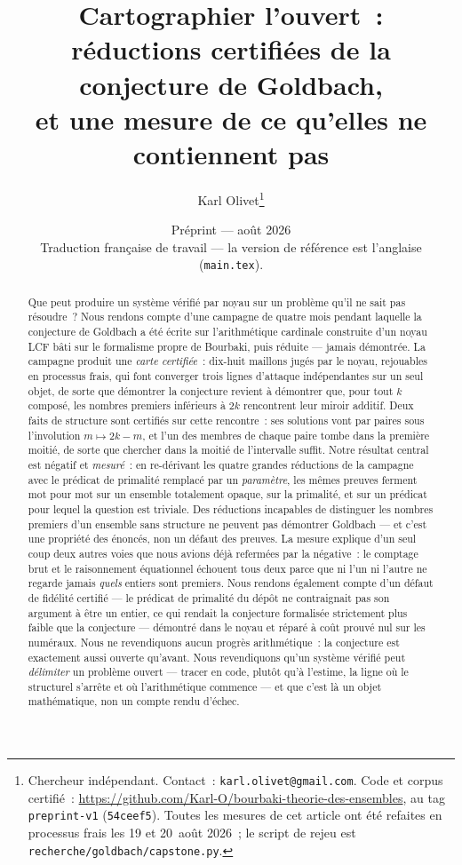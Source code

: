 \documentclass[11pt]{article}
\title{Cartographier l'ouvert~:\\
réductions certifiées de la conjecture de Goldbach,\\
et une mesure de ce qu'elles ne contiennent pas}
\author{Karl Olivet\thanks{Chercheur indépendant. Contact~:
\texttt{karl.olivet@gmail.com}. Code et corpus certifié~: \url{https://github.com/Karl-O/bourbaki-theorie-des-ensembles}, au tag
\texttt{preprint-v1} (\texttt{54ceef5}).
Toutes les mesures de cet article ont été refaites en processus frais les 19 et
20~août 2026~; le script de rejeu est \texttt{recherche/goldbach/capstone.py}.}}
\date{Préprint --- août 2026\\
{\small Traduction française de travail --- la version de référence est l'anglaise (\texttt{main.tex}).}}
\theoremstyle{remark}\newtheorem{remarque}{Remarque}
\begin{document}
\maketitle

\begin{abstract}
Que peut produire un système vérifié par noyau sur un problème qu'il ne sait pas
résoudre~? Nous rendons compte d'une campagne de quatre mois pendant laquelle la
conjecture de Goldbach a été écrite sur l'arithmétique cardinale construite d'un noyau
LCF bâti sur le formalisme propre de Bourbaki, puis réduite --- jamais démontrée. La
campagne produit une \emph{carte certifiée}~: dix-huit maillons jugés par le noyau,
rejouables en processus frais, qui font converger trois lignes d'attaque indépendantes
sur un seul objet, de sorte que démontrer la conjecture revient à démontrer que, pour
tout $k$ composé, les nombres premiers inférieurs à $2k$ rencontrent leur miroir
additif. Deux faits de structure sont certifiés sur cette rencontre~: ses solutions vont
par paires sous l'involution $m \mapsto 2k-m$, et l'un des membres de chaque paire tombe
dans la première moitié, de sorte que chercher dans la moitié de l'intervalle suffit.
Notre résultat central est négatif et \emph{mesuré}~: en re-dérivant les quatre grandes
réductions de la campagne avec le prédicat de primalité remplacé par un
\emph{paramètre}, les mêmes preuves ferment mot pour mot sur un ensemble totalement
opaque, sur la primalité, et sur un prédicat pour lequel la question est triviale. Des
réductions incapables de distinguer les nombres premiers d'un ensemble sans structure ne
peuvent pas démontrer Goldbach --- et c'est une propriété des énoncés, non un défaut des
preuves. La mesure explique d'un seul coup deux autres voies que nous avions déjà
refermées par la négative~: le comptage brut et le raisonnement équationnel échouent
tous deux parce que ni l'un ni l'autre ne regarde jamais \emph{quels} entiers sont
premiers. Nous rendons également compte d'un défaut de fidélité certifié --- le prédicat
de primalité du dépôt ne contraignait pas son argument à être un entier, ce qui rendait
la conjecture formalisée strictement plus faible que la conjecture --- démontré dans le
noyau et réparé à coût prouvé nul sur les numéraux. Nous ne revendiquons aucun progrès
arithmétique~: la conjecture est exactement aussi ouverte qu'avant. Nous revendiquons
qu'un système vérifié peut \emph{délimiter} un problème ouvert --- tracer en code, plutôt
qu'à l'estime, la ligne où le structurel s'arrête et où l'arithmétique commence --- et
que c'est là un objet mathématique, non un compte rendu d'échec.
\end{abstract}
\end{document}
